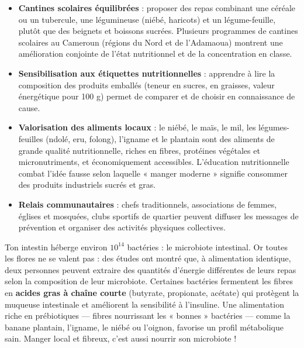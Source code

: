 \documentclass[11pt]{article}
\newcommand{\cle}[1]{{\popxbold\color{popdark}#1}}
\begin{document}
\begin{itemize}
\item \textbf{Cantines scolaires équilibrées} : proposer des repas combinant une céréale ou un tubercule, une légumineuse (niébé, haricots) et un légume-feuille, plutôt que des beignets et boissons sucrées. Plusieurs programmes de cantines scolaires au Cameroun (régions du Nord et de l'Adamaoua) montrent une amélioration conjointe de l'état nutritionnel et de la concentration en classe.
\item \textbf{Sensibilisation aux étiquettes nutritionnelles} : apprendre à lire la composition des produits emballés (teneur en sucres, en graisses, valeur énergétique pour 100 g) permet de comparer et de choisir en connaissance de cause.
\item \textbf{Valorisation des aliments locaux} : le niébé, le maïs, le mil, les légumes-feuilles (ndolé, eru, folong), l'igname et le plantain sont des aliments de grande qualité nutritionnelle, riches en fibres, protéines végétales et micronutriments, et économiquement accessibles. L'éducation nutritionnelle combat l'idée fausse selon laquelle « manger moderne » signifie consommer des produits industriels sucrés et gras.
\item \textbf{Relais communautaires} : chefs traditionnels, associations de femmes, églises et mosquées, clubs sportifs de quartier peuvent diffuser les messages de prévention et organiser des activités physiques collectives.
\end{itemize}

\begin{savaistu}
Ton intestin héberge environ $10^{14}$ bactéries : le \cle{microbiote intestinal}. Or toutes les flores ne se valent pas : des études ont montré que, à alimentation identique, deux personnes peuvent extraire des quantités d'énergie différentes de leurs repas selon la composition de leur microbiote. Certaines bactéries fermentent les fibres en \textbf{acides gras à chaîne courte} (butyrate, propionate, acétate) qui protègent la muqueuse intestinale et améliorent la sensibilité à l'insuline. Une alimentation riche en \cle{prébiotiques} — fibres nourrissant les « bonnes » bactéries — comme la banane plantain, l'igname, le niébé ou l'oignon, favorise un profil métabolique sain. Manger local et fibreux, c'est aussi nourrir son microbiote !
\end{savaistu}
\end{document}
